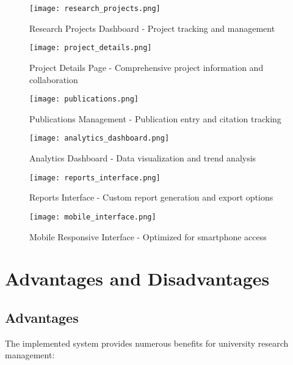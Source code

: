 \documentclass[12pt,a4paper]{article}
\begin{document}
\begin{figure}[H]
    \centering
    \texttt{[image: research\_projects.png]}
    \caption{Research Projects Dashboard - Project tracking and management}
    \label{fig:projects}
\end{figure}

\begin{figure}[H]
    \centering
    \texttt{[image: project\_details.png]}
    \caption{Project Details Page - Comprehensive project information and collaboration}
    \label{fig:project_details}
\end{figure}

\begin{figure}[H]
    \centering
    \texttt{[image: publications.png]}
    \caption{Publications Management - Publication entry and citation tracking}
    \label{fig:publications}
\end{figure}

\begin{figure}[H]
    \centering
    \texttt{[image: analytics\_dashboard.png]}
    \caption{Analytics Dashboard - Data visualization and trend analysis}
    \label{fig:analytics}
\end{figure}

\begin{figure}[H]
    \centering
    \texttt{[image: reports\_interface.png]}
    \caption{Reports Interface - Custom report generation and export options}
    \label{fig:reports}
\end{figure}

\begin{figure}[H]
    \centering
    \texttt{[image: mobile\_interface.png]}
    \caption{Mobile Responsive Interface - Optimized for smartphone access}
    \label{fig:mobile}
\end{figure}

\section{Advantages and Disadvantages}

\subsection{Advantages}
The implemented system provides numerous benefits for university research management:
\end{document}
